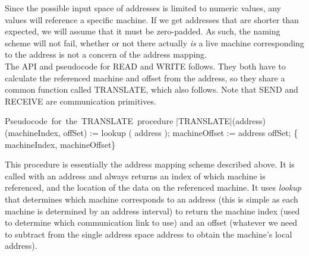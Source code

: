 \documentclass[11pt]{article}
\begin{document}
Since the possible input space of addresses is limited to numeric values, any
values will reference a specific machine. If we get addresses that are shorter
than expected, we will assume that it must be zero-padded. As such, the naming
scheme will not fail, whether or not there actually \emph{is} a live machine
corresponding to the address is not a concern of the address mapping.\\


The API and pseudocode for READ and WRITE follows. They both have to calculate the referenced machine and offset from the address, so they share a common function called TRANSLATE, which also follows. Note that SEND and RECEIVE are communication primitives.



\begin{program}
\mbox{Pseudocode for the TRANSLATE procedure}
       \PROC |TRANSLATE|(address) \BODY
                 (machineIndex, offSet) := lookup ( address );
                 machineOffset := address \; \text{-} \; offSet;
                  \; \{ machineIndex, machineOffset\} \ENDPROC
\end{program}

This procedure is essentially the address mapping scheme described above. It is
called with an address and always returns an index of which machine is
referenced, and the location of the data on the referenced machine. It uses
\emph{lookup} that determines which machine corresponds to an address (this
is simple as each machine is determined by an address interval) to return
the machine index (used to determine which communication link to use) and an
offset (whatever we need to subtract from the single address space address to
obtain the machine's local address).
\end{document}
